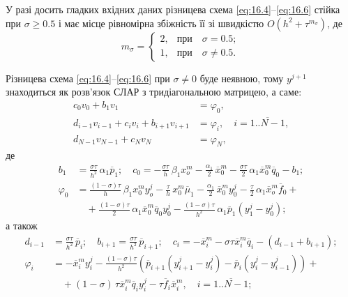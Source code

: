 \documentclass[12pt, a4paper]{article}
\newcommand{\ol}[1]{\overline{#1}}
\newcommand{\range}[2]{\ol{#1..#2}}
\renewcommand{\phi}{\varphi}
\renewcommand{\ge}{\geqslant}
\begin{document}
У разі досить гладких вхідних даних різницева схема \eqref{eq:16.4}--\eqref{eq:16.6} стійка при $\sigma \ge 0.5$ і має місце рівномірна збіжність її зі швидкістю $O(h^2 + \tau^{m_\sigma})$, де
\begin{equation*}
    m_\sigma = \begin{cases}
        2, & \text{при} \quad \sigma = 0.5; \\
        1, & \text{при} \quad \sigma \ne 0.5.
    \end{cases}
\end{equation*}

Різницева схема \eqref{eq:16.4}--\eqref{eq:16.6} при $\sigma \ne 0$ буде неявною, тому $y^{j + 1}$ знаходиться як розв'язок СЛАР з тридіагональною матрицею, а саме:
\begin{equation}
    \label{eq:16.7}
    \begin{aligned}
        c_0 v_0 + b_1 v_1 &= \phi_0, \\
        d_{i - 1} v_{i - 1} + c_i v_i + b_{i + 1} v_{i + 1} &= \phi_i, \quad i = \range{1}{N - 1}, \\
        d_{N - 1} v_{N - 1} + c_N v_N &= \phi_N, 
    \end{aligned}
\end{equation}
де
\begin{equation}
    \label{eq:16.8.1}
    \begin{aligned}
        b_1 &= \frac{\sigma \tau}{h^2} \, \alpha_1 \ol p_1; \quad c_0 = -\frac{\sigma \tau}{h} \, \beta_1 x_o^m - \frac{\alpha_1}{2} \, \ol x_0^m - \frac{\sigma \tau}{2} \, \alpha_1 \ol x_0^m \ol q_0 - b_1; \\
        \phi_0 &= \frac{(1 - \sigma) \tau}{h} \, \beta_1 x_0^m y_o^j - \frac{\tau}{h} \, x_0^m \ol \mu_1 - \frac{\alpha_1}{2} \, \ol x_0^m y_0^j - \frac{\tau}{2} \,\alpha_1 \ol x_o^m \ol f_0 + \\
        &\quad + \frac{(1 - \sigma) \tau}{2} \, \alpha_1 \ol x_0^m \ol q_0 y_0^j - \frac{(1 - \sigma) \tau}{h^2} \, \alpha_1 \ol p_1 \left( y_1^j - y_0^j \right);
    \end{aligned}
\end{equation}
а також
\begin{equation}
    \label{eq:16.8.2}
    \begin{aligned}
        d_{i - 1} &= \frac{\sigma \tau}{h^2} \, \ol p_i; \quad b_{i + 1} = \frac{\sigma \tau}{h^2} \, \ol p_{i + 1}; \quad c_i = - \ol x_i^m - \sigma \tau \ol x_i^m \ol q_i - (d_{i - 1} + b_{i + 1}); \\
        \phi_i &= -\ol x_i^m y_i^j - \frac{(1 - \sigma) \tau}{h^2} \left( \ol p_{i + 1} \left( y_{i + 1}^j - y_i^j \right)  - \ol p_i \left( y_i^j - y_{i - 1}^j \right) \right) + \\
        &\quad + (1 - \sigma) \, \tau \ol x_i^m \ol q_i y_i^j - \tau \ol f_i \ol x_i^m, \quad i = \range{1}{N - 1};
    \end{aligned}
\end{equation}
\end{document}
